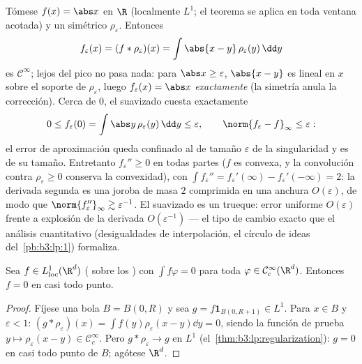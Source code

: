 \begin{example}
\label{ex:b3:lp:mollifyexample}
Tómese $f(x) = \abs x$ en $\R$ (localmente $L^1$; el teorema se aplica
en toda ventana acotada) y un  simétrico $\rho_\varepsilon$. Entonces
\[
f_\varepsilon(x) = (f * \rho_\varepsilon)(x)
= \int\abs{x - y}\,\rho_\varepsilon(y)\,\dd y
\]
es $\mathcal C^\infty$; lejos del pico no pasa nada: para
$\abs x \geq \varepsilon$, $\abs{x - y}$ es lineal en $x$ sobre el
soporte de $\rho_\varepsilon$, luego $f_\varepsilon(x) =
\abs x$ \emph{exactamente} (la simetría anula la corrección). Cerca de
$0$, el suavizado cuesta exactamente
\[
0 \leq f_\varepsilon(0) = \int\abs
y\,\rho_\varepsilon(y)\,\dd y \leq \varepsilon,
\qquad
\norm{f_\varepsilon - f}_\infty \leq \varepsilon :
\]
el error de aproximación queda confinado al  de tamaño
$\varepsilon$ de la singularidad y es de su tamaño. Entretanto
$f_\varepsilon'' \geq 0$ en todas partes ($f$ es convexa, y la
convolución contra $\rho_\varepsilon
\geq 0$ conserva la convexidad), con $\int f_\varepsilon'' =
f_\varepsilon'(\infty) - f_\varepsilon'(-\infty) = 2$: la derivada
segunda es una joroba de masa $2$ comprimida en una anchura
$O(\varepsilon)$, de modo que $\norm{f_\varepsilon''}_\infty \gtrsim
\varepsilon^{-1}$. El suavizado es un trueque: error uniforme
$O(\varepsilon)$ frente a explosión de la derivada $O(\varepsilon^{-1})$
--- el tipo de cambio exacto que el análisis cuantitativo (desigualdades
de interpolación, el círculo de ideas del~\cref{pb:b3:lp:1}) formaliza.
\end{example}

\begin{corollary}\label{cor:b3:lp:fundlemma} Sea
$f \in L^1_{\mathrm{loc}}(\R^d)$
( sobre los
) con $\int f\varphi = 0$
para toda $\varphi \in \mathcal
C^\infty_c(\R^d)$. Entonces $f = 0$ en casi todo punto.
\end{corollary}

\begin{proof}
Fíjese una bola $B = B(0, R)$ y sea $g = f\mathbf 1_{B(0, R+1)}
\in L^1$. Para $x \in B$ y $\varepsilon < 1$: $(g *
\rho_\varepsilon)(x) = \int f(y)\rho_\varepsilon(x - y)\dd y =
0$, siendo la función de prueba $y \mapsto \rho_\varepsilon(x-y)
\in \mathcal C_c^\infty$. Pero $g * \rho_\varepsilon \to g$ en $L^1$
(el~\cref{thm:b3:lp:regularization}): $g = 0$ en casi todo punto de $B$;
agótese $\R^d$.
\end{proof}

